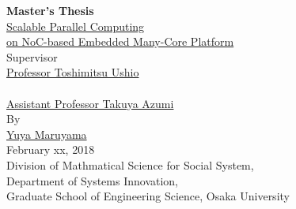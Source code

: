 \documentclass[a4j,12pt,oneside,openany,english]{jsbook}
\date{\today}
\begin{document}
\renewcommand{\headfont}{\bfseries}

\renewcommand{\baselinestretch}{1.1}

\thispagestyle{empty}
\begin{center}
  \vspace*{5mm}
  {\Huge {\bf Master's Thesis}}\\
  \vspace{2cm}
  \vspace{1cm}
  \underline{\LARGE{Scalable Parallel Computing}} \\
  \vspace{0.2cm}  
  \underline{\LARGE{on NoC-based Embedded Many-Core Platform}} \\  
  \vspace{0.5cm}
  \vspace{12mm}
  {\large Supervisor}\\
  \vspace{6mm}
  \underline{\Large Professor Toshimitsu Ushio}\\
  　\\
  \underline{\Large Assistant Professor Takuya Azumi}\\
  \vspace{8mm}
  {\large By}\\
  \vspace{6mm}
  \underline{\Large Yuya Maruyama}\\
  \vspace{10mm}
  {\Large February xx, 2018}\\  
  \vspace{14mm}
  {\Large Division of Mathmatical Science for Social System,\\
    Department of Systems Innovation,\\
    Graduate School of Engineering Science, Osaka University}\\
\end{center}
\clearpage
\setcounter{page}{0}
\end{document}
